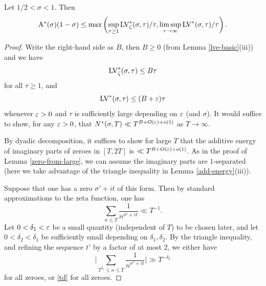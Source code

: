 \begin{lemma}\label{zeroe-from-large}  Let $1/2 < \sigma < 1$.  Then
$$ \mathrm{A}^*(\sigma)(1-\sigma) \leq \max\left( \sup_{\tau \geq 1} \mathrm{LV}^*_\zeta(\sigma,\tau)/\tau, \limsup_{\tau \to \infty} \mathrm{LV}^*(\sigma,\tau)/\tau \right).$$
\end{lemma}

\begin{proof}
Write the right-hand side as $B$, then $B \geq 0$ (from Lemma \ref{lve-basic}(iii)) and we have
\begin{equation}\label{lvze-bound}
    \mathrm{LV}^*_\zeta(\sigma,\tau) \leq B \tau
\end{equation}
for all $\tau \geq 1$, and
\begin{equation}\label{lve-bound}
    \mathrm{LV}^*(\sigma,\tau) \leq (B+\varepsilon) \tau
\end{equation}
whenever $\varepsilon>0$ and $\tau$ is sufficiently large depending on $\varepsilon$ (and $\sigma$).  It would suffice to show, for any $\varepsilon>0$, that $N^*(\sigma,T) \ll T^{B+O(\varepsilon)+o(1)}$ as $T \to \infty$.

By dyadic decomposition, it suffices to show for large $T$ that the additive energy of imaginary parts of zeroes in $[T,2T]$ is $\ll T^{B+O(\varepsilon)+o(1)}$.  As in the proof of Lemma \ref{zero-from-large}, we can assume the imaginary parts are $1$-separated (here we take advantage of the triangle inequality in Lemma \ref{add-energy}(iii)).

Suppose that one has a zero $\sigma'+i t$ of this form.  Then by standard approximations to the zeta function, one has
$$ \sum_{n \leq T} \frac{1}{n^{\sigma'+it}} \ll T^{-1}.$$
Let $0 < \delta_1 < \varepsilon$ be a small quantity (independent of $T$) to be chosen later, and let $0 < \delta_2 < \delta_1$ be sufficiently small depending on $\delta_1,\delta_2$.  By the triangle inequality, and refining the sequence $t'$ by a factor of at most $2$, we either have
$$ \bigg|\sum_{T^{\delta_1} \leq n \leq T} \frac{1}{n^{\sigma'+it}} \bigg| \gg T^{-\delta_2}$$
for all zeroes, or \eqref{td}
for all zeroes.


\end{proof}

